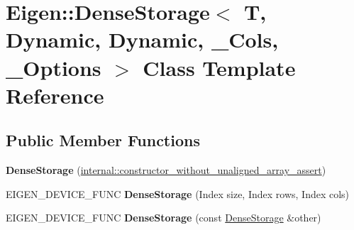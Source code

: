 \hypertarget{class_eigen_1_1_dense_storage_3_01_t_00_01_dynamic_00_01_dynamic_00_01___cols_00_01___options_01_4}{}\section{Eigen\+::Dense\+Storage$<$ T, Dynamic, Dynamic, \+\_\+\+Cols, \+\_\+\+Options $>$ Class Template Reference}
\label{class_eigen_1_1_dense_storage_3_01_t_00_01_dynamic_00_01_dynamic_00_01___cols_00_01___options_01_4}
\subsection*{Public Member Functions}
\begin{DoxyCompactItemize}
\item 
\mbox{\label{class_eigen_1_1_dense_storage_3_01_t_00_01_dynamic_00_01_dynamic_00_01___cols_00_01___options_01_4_a653e6def106aa1c7538759f1bde4f9f2}} 
{\bfseries Dense\+Storage} (\mbox{\hyperlink{struct_eigen_1_1internal_1_1constructor__without__unaligned__array__assert}{internal\+::constructor\+\_\+without\+\_\+unaligned\+\_\+array\+\_\+assert}})
\item 
\mbox{\label{class_eigen_1_1_dense_storage_3_01_t_00_01_dynamic_00_01_dynamic_00_01___cols_00_01___options_01_4_ab563f1ee2e81b513b7fea1275efb64db}} 
E\+I\+G\+E\+N\+\_\+\+D\+E\+V\+I\+C\+E\+\_\+\+F\+U\+NC {\bfseries Dense\+Storage} (Index size, Index rows, Index cols)
\item 
\mbox{\label{class_eigen_1_1_dense_storage_3_01_t_00_01_dynamic_00_01_dynamic_00_01___cols_00_01___options_01_4_a6dc1be1311259c4c03eeca000544b096}} 
E\+I\+G\+E\+N\+\_\+\+D\+E\+V\+I\+C\+E\+\_\+\+F\+U\+NC {\bfseries Dense\+Storage} (const \mbox{\hyperlink{class_eigen_1_1_dense_storage}{Dense\+Storage}} \&other)
\item 
\mbox{\label{class_eigen_1_1_dense_storage_3_01_t_00_01_dynamic_00_01_dynamic_00_01___cols_00_01___options_01_4_a933214261fd131f554eb0222300f0479}} 

\end{DoxyCompactItemize}
